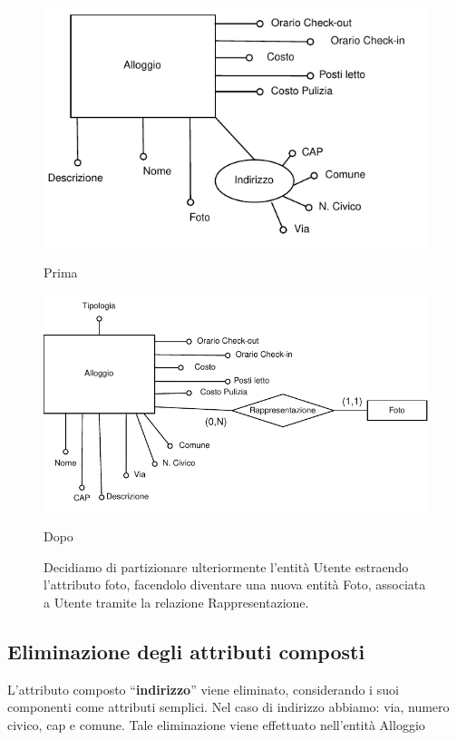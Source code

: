 \begin{figure}[H]
      \centering
      \begin{minipage}[b]{0.40\textwidth}
            \includegraphics[width=\textwidth]{resources/pdf/page17.pdf}
            \caption{Prima}
      \end{minipage}
      \hfill
      \begin{minipage}[b]{0.50\textwidth}
            \includegraphics[width=\textwidth]{resources/pdf/page18.pdf}
            \caption{Dopo}
      \end{minipage}
      \caption*{Decidiamo di partizionare ulteriormente l'entità Utente estraendo l'attributo foto, facendolo diventare una nuova entità Foto, associata a Utente tramite la relazione Rappresentazione.}
\end{figure}

\subsection{Eliminazione degli attributi composti}
L’attributo composto “\textbf{indirizzo}” viene eliminato, considerando i suoi componenti come attributi semplici. Nel caso di indirizzo abbiamo: via, numero civico, cap e comune.
Tale eliminazione viene effettuato nell'entità Alloggio